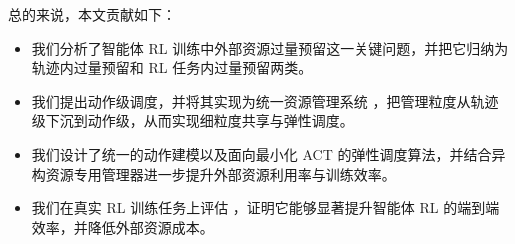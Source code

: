 总的来说，本文贡献如下：
\begin{itemize}[leftmargin=10pt]
    \item 我们分析了智能体 RL 训练中外部资源过量预留这一关键问题，并把它归纳为轨迹内过量预留和 RL 任务内过量预留两类。
    \item 我们提出动作级调度，并将其实现为统一资源管理系统 \sysname，把管理粒度从轨迹级下沉到动作级，从而实现细粒度共享与弹性调度。
    \item 我们设计了统一的动作建模以及面向最小化 ACT 的弹性调度算法，并结合异构资源专用管理器进一步提升外部资源利用率与训练效率。
    \item 我们在真实 RL 训练任务上评估 \sysname，证明它能够显著提升智能体 RL 的端到端效率，并降低外部资源成本。
\end{itemize}
